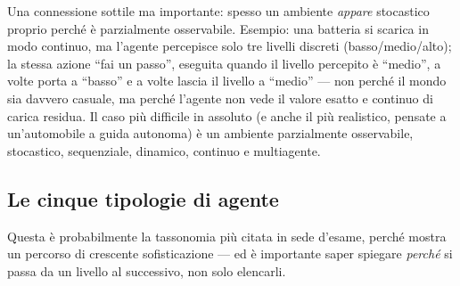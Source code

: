 \documentclass[11pt,a4paper]{article}
\begin{document}
Una connessione sottile ma importante: spesso un ambiente \emph{appare} stocastico proprio perché è parzialmente osservabile. Esempio: una batteria si scarica in modo continuo, ma l'agente percepisce solo tre livelli discreti (basso/medio/alto); la stessa azione ``fai un passo'', eseguita quando il livello percepito è ``medio'', a volte porta a ``basso'' e a volte lascia il livello a ``medio'' --- non perché il mondo sia davvero casuale, ma perché l'agente non vede il valore esatto e continuo di carica residua. Il caso più difficile in assoluto (e anche il più realistico, pensate a un'automobile a guida autonoma) è un ambiente parzialmente osservabile, stocastico, sequenziale, dinamico, continuo e multiagente.

\subsection{Le cinque tipologie di agente}

Questa è probabilmente la tassonomia più citata in sede d'esame, perché mostra un percorso di crescente sofisticazione --- ed è importante saper spiegare \emph{perché} si passa da un livello al successivo, non solo elencarli.
\end{document}
